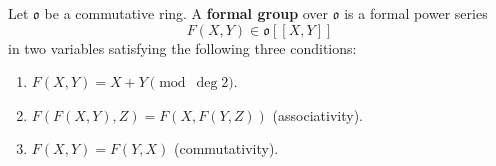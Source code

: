 Let $\mathfrak{o}$ be a commutative ring. A \textbf{formal group} over $\mathfrak{o}$ is a formal power series
$$
F(X,Y) \in \mathfrak{o}[[X,Y]]
$$
in two variables satisfying the following three conditions:
\begin{enumerate}
\item $F(X,Y) = X + Y \pmod{\deg 2}$.
\item $F(F(X,Y), Z) = F(X, F(Y,Z))$ (associativity).
\item $F(X,Y) = F(Y,X)$ (commutativity).
\end{enumerate}
